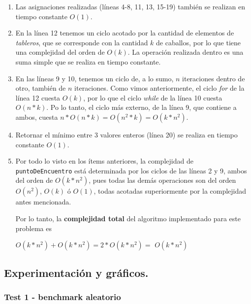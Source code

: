 \begin{enumerate}
  \item Las asignaciones realizadas (líneas 4-8, 11, 13, 15-19) también se realizan en tiempo constante $O(1)$.

  \item En la línea 12 tenemos un ciclo acotado por la cantidad de elementos de \textit{tableros}, que se corresponde con la cantidad $k$ de caballos, por lo que tiene una complejidad del orden de $O(k)$. La operación realizada dentro es una suma simple que se realiza en tiempo constante.

  \item En las líneas 9 y 10, tenemos un ciclo de, a lo sumo, $n$ iteraciones dentro de otro, también de $n$ iteraciones. Como vimos anteriormente, el ciclo \textit{for} de la línea 12 cuesta $O(k)$, por lo que el ciclo
  \textit{while} de la línea 10 cuesta $O(n*k)$. Po lo tanto, el ciclo más externo, de la línea 9, que contiene a ambos, cuesta $n*O(n*k) = O(n^2*k) = O(k*n^2)$.

  \item Retornar el mínimo entre 3 valores enteros (línea 20) se realiza en tiempo constante $O(1)$.

  \item Por todo lo visto en los ítems anteriores, la complejidad de \verb|puntoDeEncuentro| está determinada por los ciclos de las líneas 2 y 9, ambos del orden de $O(k*n^2)$, pues todas las demás operaciones son del orden      $O(n^2)$, $O(k)$ ó $O(1)$, todas acotadas superiormente por la complejidad
  antes mencionada.

Por lo tanto, la \textbf{complejidad total} del algoritmo implementado para este problema es

\begin{center}
  $O(k*n^2) + O(k*n^2) = 2*O(k*n^2) =$ \textit{\textbf{$O(k*n^2)$}}
\end{center}

\end{enumerate}



\newpage
\subsection{Experimentación y gráficos.}

\vspace*{0.3cm}

\subsubsection{Test 1 - benchmark aleatorio}

